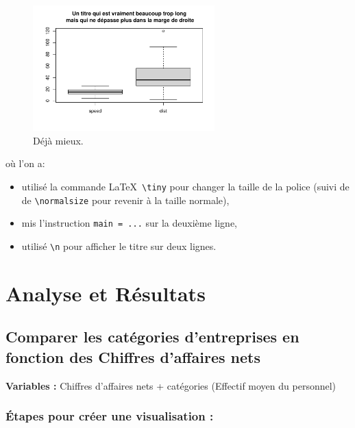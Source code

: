 \documentclass[mstat,12pt]{unswthesis}
\begin{document}
\begin{figure}

{\centering \includegraphics[width=7cm]{scdon2-UPV-report-template_sansPython_files/figure-latex/unnamed-chunk-3-1} 

}

\caption{Déjà mieux.}\label{fig:unnamed-chunk-3}
\end{figure}

\normalsize

où l'on a:

\begin{itemize}
\tightlist
\item
  utilisé la commande \LaTeX~\texttt{\textbackslash{}tiny} pour changer
  la taille de la police (suivi de de
  \texttt{\textbackslash{}normalsize} pour revenir à la taille normale),
\item
  mis l'instruction \texttt{main\ =\ ...} sur la deuxième ligne,
\item
  utilisé \texttt{\textbackslash{}n} pour afficher le titre sur deux
  lignes.
\end{itemize}

\chapter{Analyse et Résultats}\label{analyse-et-ruxe9sultats}

\section{\texorpdfstring{\textbf{Comparer les catégories d'entreprises
en fonction des Chiffres d'affaires
nets}}{Comparer les catégories d'entreprises en fonction des Chiffres d'affaires nets}}\label{comparer-les-catuxe9gories-dentreprises-en-fonction-des-chiffres-daffaires-nets}

\bigskip

\textbf{Variables :} Chiffres d'affaires nets + catégories (Effectif
moyen du personnel)

\subsection{Étapes pour créer une visualisation
:}\label{uxe9tapes-pour-cruxe9er-une-visualisation}
\end{document}

